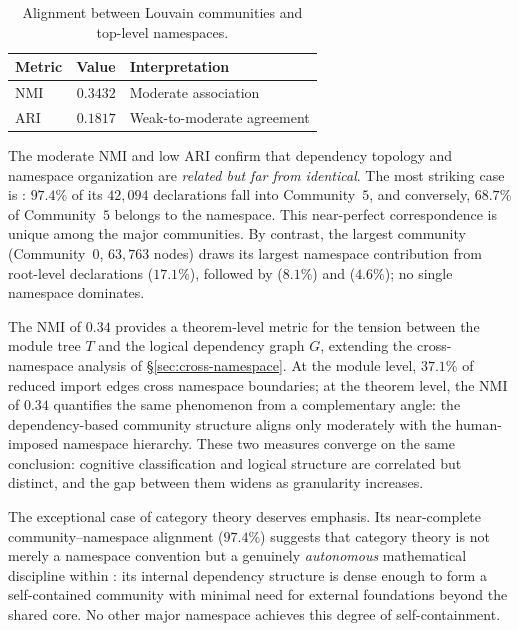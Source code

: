 \begin{table}[ht]
\centering
\caption{Alignment between Louvain communities and top-level namespaces.}
\label{tab:thm-nmi}
\begin{tabular}{lrl}
\toprule
Metric & Value & Interpretation \\
\midrule
NMI & $0.3432$ & Moderate association \\
ARI & $0.1817$ & Weak-to-moderate agreement \\
\bottomrule
\end{tabular}
\end{table}

The moderate NMI and low ARI confirm that dependency topology and namespace organization are \emph{related but far from identical}. The most striking case is : $97.4\%$ of its $42{,}094$ declarations fall into Community~$5$, and conversely, $68.7\%$ of Community~$5$ belongs to the  namespace. This near-perfect correspondence is unique among the major communities. By contrast, the largest community (Community~$0$, $63{,}763$ nodes) draws its largest namespace contribution from root-level declarations ($17.1\%$), followed by  ($8.1\%$) and  ($4.6\%$); no single namespace dominates.

\label{rem:nmi-tension}
The NMI of $0.34$ provides a theorem-level metric for the tension between the module tree $T$ and the logical dependency graph $G$, extending the cross-namespace analysis of \S\ref{sec:cross-namespace}. At the module level, $37.1\%$ of reduced import edges cross namespace boundaries; at the theorem level, the NMI of $0.34$ quantifies the same phenomenon from a complementary angle: the dependency-based community structure aligns only moderately with the human-imposed namespace hierarchy. These two measures converge on the same conclusion: cognitive classification and logical structure are correlated but distinct, and the gap between them widens as granularity increases.

The exceptional case of category theory deserves emphasis. Its near-complete community--namespace alignment ($97.4\%$) suggests that category theory is not merely a namespace convention but a genuinely \emph{autonomous} mathematical discipline within : its internal dependency structure is dense enough to form a self-contained community with minimal need for external foundations beyond the shared core. No other major namespace achieves this degree of self-containment.



